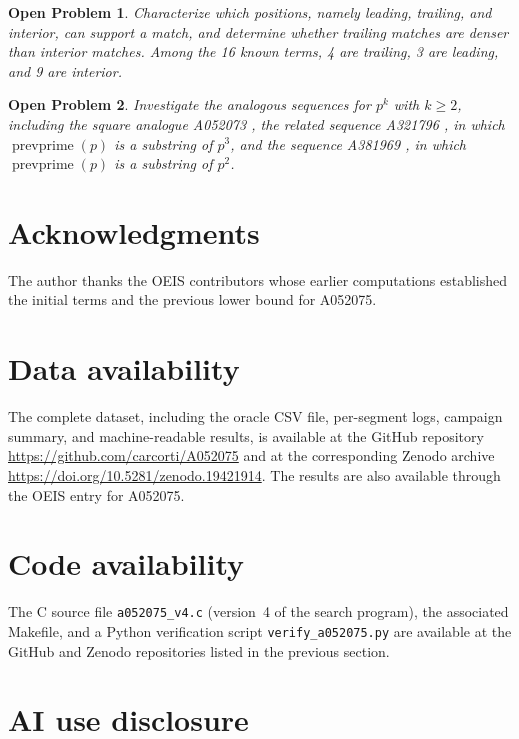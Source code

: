 \documentclass[11pt]{article}
\newtheorem{openproblem}{Open Problem}
\theoremstyle{definition}
\theoremstyle{remark}
\newcommand{\prevprime}{\operatorname{prevprime}}
\begin{document}
\begin{openproblem}
\label{op:positions}
Characterize which positions, namely leading, trailing, and interior,
can support a match, and determine whether trailing matches are denser
than interior matches.
Among the 16 known terms, 4 are trailing, 3 are leading, and
9 are interior.
\end{openproblem}

\begin{openproblem}
\label{op:analogues}
Investigate the analogous sequences for $p^k$ with $k \geq 2$,
including the square analogue
A052073 \cite{OEIS_A052073},
the related sequence A321796 \cite{OEIS_A321796},
in which $\prevprime(p)$ is a substring of $p^3$,
and the sequence A381969 \cite{OEIS_A381969},
in which $\prevprime(p)$ is a substring of $p^2$.
\end{openproblem}

\section*{Acknowledgments}

The author thanks the OEIS contributors whose earlier computations
established the initial terms and the previous lower bound for
A052075.

\section*{Data availability}

The complete dataset, including the oracle CSV file, per-segment logs,
campaign summary, and machine-readable results, is available at
the GitHub repository
\url{https://github.com/carcorti/A052075}
and at the corresponding Zenodo archive
\url{https://doi.org/10.5281/zenodo.19421914}.
The results are also available through the OEIS entry
for A052075.

\section*{Code availability}

The C source file \texttt{a052075\_v4.c} (version~4 of the search
program), the associated Makefile, and a Python verification script
\texttt{verify\_a052075.py} are available at the GitHub and Zenodo
repositories listed in the previous section.

\section*{AI use disclosure}
\end{document}

